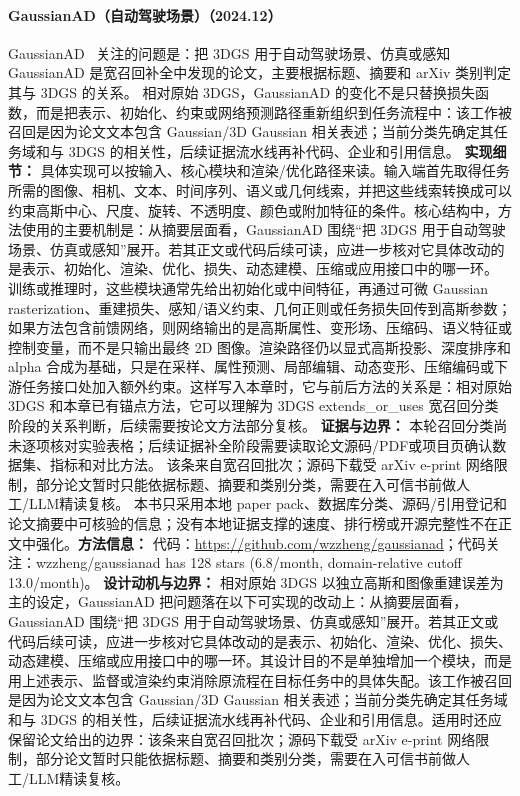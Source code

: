 \paragraph{GaussianAD（自动驾驶场景）（2024.12）}
GaussianAD~\cite{2412_10371} 关注的问题是：把 3DGS 用于自动驾驶场景、仿真或感知 GaussianAD 是宽召回补全中发现的论文，主要根据标题、摘要和 arXiv 类别判定其与 3DGS 的关系。
相对原始 3DGS，GaussianAD 的变化不是只替换损失函数，而是把表示、初始化、约束或网络预测路径重新组织到任务流程中：该工作被召回是因为论文文本包含 Gaussian/3D Gaussian 相关表述；当前分类先确定其任务域和与 3DGS 的相关性，后续证据流水线再补代码、企业和引用信息。
\textbf{实现细节：} 具体实现可以按输入、核心模块和渲染/优化路径来读。输入端首先取得任务所需的图像、相机、文本、时间序列、语义或几何线索，并把这些线索转换成可以约束高斯中心、尺度、旋转、不透明度、颜色或附加特征的条件。核心结构中，方法使用的主要机制是：从摘要层面看，GaussianAD 围绕“把 3DGS 用于自动驾驶场景、仿真或感知”展开。若其正文或代码后续可读，应进一步核对它具体改动的是表示、初始化、渲染、优化、损失、动态建模、压缩或应用接口中的哪一环。 训练或推理时，这些模块通常先给出初始化或中间特征，再通过可微 Gaussian rasterization、重建损失、感知/语义约束、几何正则或任务损失回传到高斯参数；如果方法包含前馈网络，则网络输出的是高斯属性、变形场、压缩码、语义特征或控制变量，而不是只输出最终 2D 图像。渲染路径仍以显式高斯投影、深度排序和 alpha 合成为基础，只是在采样、属性预测、局部编辑、动态变形、压缩编码或下游任务接口处加入额外约束。这样写入本章时，它与前后方法的关系是：相对原始 3DGS 和本章已有锚点方法，它可以理解为 3DGS extends\_or\_uses 宽召回分类阶段的关系判断，后续需要按论文方法部分复核。
\textbf{证据与边界：} 本轮召回分类尚未逐项核对实验表格；后续证据补全阶段需要读取论文源码/PDF或项目页确认数据集、指标和对比方法。 该条来自宽召回批次；源码下载受 arXiv e-print 网络限制，部分论文暂时只能依据标题、摘要和类别分类，需要在入可信书前做人工/LLM精读复核。 本书只采用本地 paper pack、数据库分类、源码/引用登记和论文摘要中可核验的信息；没有本地证据支撑的速度、排行榜或开源完整性不在正文中强化。\textbf{方法信息：} 代码：\url{https://github.com/wzzheng/gaussianad}；代码关注：wzzheng/gaussianad has 128 stars (6.8/month, domain-relative cutoff 13.0/month)。
\textbf{设计动机与边界：} 相对原始 3DGS 以独立高斯和图像重建误差为主的设定，GaussianAD 把问题落在以下可实现的改动上：从摘要层面看，GaussianAD 围绕“把 3DGS 用于自动驾驶场景、仿真或感知”展开。若其正文或代码后续可读，应进一步核对它具体改动的是表示、初始化、渲染、优化、损失、动态建模、压缩或应用接口中的哪一环。其设计目的不是单独增加一个模块，而是用上述表示、监督或渲染约束消除原流程在目标任务中的具体失配。该工作被召回是因为论文文本包含 Gaussian/3D Gaussian 相关表述；当前分类先确定其任务域和与 3DGS 的相关性，后续证据流水线再补代码、企业和引用信息。适用时还应保留论文给出的边界：该条来自宽召回批次；源码下载受 arXiv e-print 网络限制，部分论文暂时只能依据标题、摘要和类别分类，需要在入可信书前做人工/LLM精读复核。
